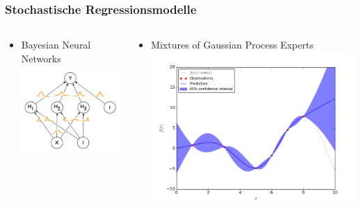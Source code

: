 \documentclass[18pt]{beamer}
\begin{document}
\begin{frame}
  \frametitle{Stochastische Regressionsmodelle}
    \begin{columns}
      \begin{column}{0.35\textwidth}
        \begin{itemize}
        \item Bayesian Neural Networks
          \includegraphics[scale=0.35]{images/bnn}
        \end{itemize}
    \end{column}
    \begin{column}{0.65\textwidth}
      \begin{itemize}
      \item Mixtures of Gaussian Process Experts
          \includegraphics[scale=0.3]{images/graph_1}
      \end{itemize}
    \end{column}
  \end{columns}
\end{frame}
\end{document}
